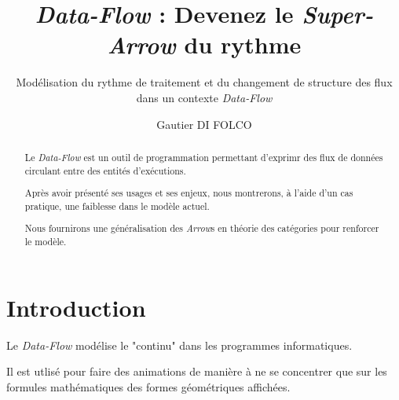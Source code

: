 \documentclass{llncs}
\newcommand{\DF}{\emph{Data-Flow} }
\newcommand{\SA}{\emph{Super-Arrow} }
\newcommand{\Arrs}{\emph{Arrow}s }
\begin{document}
\title{\DF : Devenez le \SA du rythme}


\subtitle{Modélisation du rythme de traitement et du changement de structure des flux dans un contexte \DF}


\author{Gautier DI FOLCO}







\maketitle

\begin{abstract}
Le \DF est un outil de programmation permettant d'exprimr des flux de
données circulant entre des entités d'exécutions.

Après avoir présenté ses usages et ses enjeux, nous montrerons, à l'aide d'un
cas pratique, une faiblesse dans le modèle actuel.

Nous fournirons une généralisation des \Arrs en théorie des catégories pour
renforcer le modèle.
\end{abstract}

\section{Introduction}
Le \DF modélise le "continu" dans les programmes informatiques.

Il est utlisé pour faire des animations de manière à ne se
concentrer que sur les formules mathématiques des formes géométriques affichées.
\end{document}
